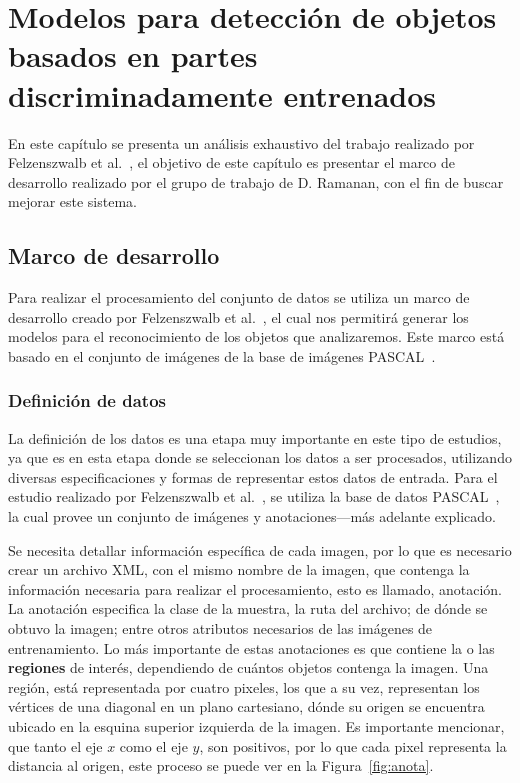 \chapter[Modelos basados en partes ]{Modelos para detección de objetos basados en partes discriminadamente entrenados }\label{ch:capitulo4}
En este capítulo se presenta un análisis exhaustivo del trabajo realizado por Felzenszwalb et al.~\cite{Felzenszwalb2010}, el objetivo de este capítulo es presentar el marco de desarrollo realizado por el grupo de trabajo de D. Ramanan, con el fin de buscar mejorar este sistema.

\section{Marco de desarrollo}\label{sec:framework}
Para realizar el procesamiento del conjunto de datos se utiliza un marco de desarrollo creado por Felzenszwalb et al.~\cite{Felzenszwalb2010}, el cual nos permitirá generar los modelos para el reconocimiento de los objetos que analizaremos. Este marco está basado en el conjunto de imágenes de la base de imágenes PASCAL~\cite{Everingham2010}.

\subsection{Definición de datos}\label{sec:datos}
La definición de los datos es una etapa muy importante en este tipo de estudios, ya que es en esta etapa donde se seleccionan los datos a ser procesados, utilizando diversas especificaciones y formas de representar estos datos de entrada. Para el estudio realizado por Felzenszwalb et al.~\cite{Felzenszwalb2010}, se utiliza la base de datos PASCAL~\cite{Everingham2010}, la cual provee un conjunto de imágenes y anotaciones---más adelante explicado.

Se necesita detallar información específica de cada imagen, por lo que es necesario crear un archivo XML, con el mismo nombre de la imagen, que contenga la información necesaria para realizar el procesamiento, esto es llamado, anotación. La anotación especifica la clase de la muestra, la ruta del archivo; de dónde se obtuvo la imagen; entre otros atributos necesarios de las imágenes de entrenamiento. Lo más importante de estas anotaciones es que contiene la o las \textbf{regiones} de interés, dependiendo de cuántos objetos contenga la imagen. Una región, está representada por cuatro pixeles, los que a su vez, representan los vértices de una diagonal en un plano cartesiano, dónde su origen se encuentra ubicado en la esquina superior izquierda de la imagen. Es importante mencionar, que tanto el eje $x$ como el eje $y$, son positivos, por lo que cada pixel representa la distancia al origen, este proceso se puede ver en la Figura~\ref{fig:anota}.

